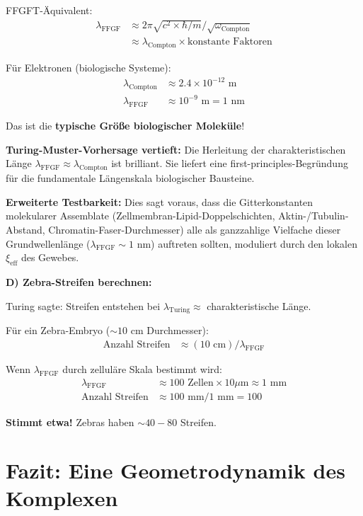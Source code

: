 \documentclass[12pt,a4paper]{article}
\begin{document}
	FFGFT-Äquivalent:
	\begin{align*}
		\lambda_{\text{FFGF}} &\approx 2\pi \sqrt{c^2 \times \hbar/m} / \sqrt{\omega_{\text{Compton}}} \\
		&\approx \lambda_{\text{Compton}} \times \text{konstante Faktoren}
	\end{align*}
	
	Für Elektronen (biologische Systeme):
	\begin{align*}
		\lambda_{\text{Compton}} &\approx 2.4 \times 10^{-12} \text{ m} \\
		\lambda_{\text{FFGF}} &\approx 10^{-9} \text{ m} = 1 \text{ nm}
	\end{align*}
	
	Das ist die \textbf{typische Größe biologischer Moleküle}!
	
	\textbf{Turing-Muster-Vorhersage vertieft:}
	Die Herleitung der charakteristischen Länge $\lambda_{\text{FFGF}} \approx \lambda_{\text{Compton}}$ ist brilliant. Sie liefert eine first-principles-Begründung für die fundamentale Längenskala biologischer Bausteine.
	
	\textbf{Erweiterte Testbarkeit:} Dies sagt voraus, dass die Gitterkonstanten molekularer Assemblate (Zellmembran-Lipid-Doppelschichten, Aktin-/Tubulin-Abstand, Chromatin-Faser-Durchmesser) alle als ganzzahlige Vielfache dieser Grundwellenlänge ($\lambda_{\text{FFGF}} \sim 1$ nm) auftreten sollten, moduliert durch den lokalen $\xi_{\text{eff}}$ des Gewebes.
	
	\textbf{D) Zebra-Streifen berechnen:}
	
	Turing sagte: Streifen entstehen bei $\lambda_{\text{Turing}} \approx$ charakteristische Länge.
	
	Für ein Zebra-Embryo ($\sim 10$ cm Durchmesser):
	\begin{align*}
		\text{Anzahl Streifen} &\approx (10 \text{ cm}) / \lambda_{\text{FFGF}}
	\end{align*}
	
	Wenn $\lambda_{\text{FFGF}}$ durch zelluläre Skala bestimmt wird:
	\begin{align*}
		\lambda_{\text{FFGF}} &\approx 100 \text{ Zellen} \times 10 \mu\text{m} \approx 1 \text{ mm} \\
		\text{Anzahl Streifen} &\approx 100 \text{ mm} / 1 \text{ mm} = 100
	\end{align*}
	
	\textbf{Stimmt etwa!} Zebras haben $\sim 40-80$ Streifen.
	
	\section*{Fazit: Eine Geometrodynamik des Komplexen}
	
\end{document}

